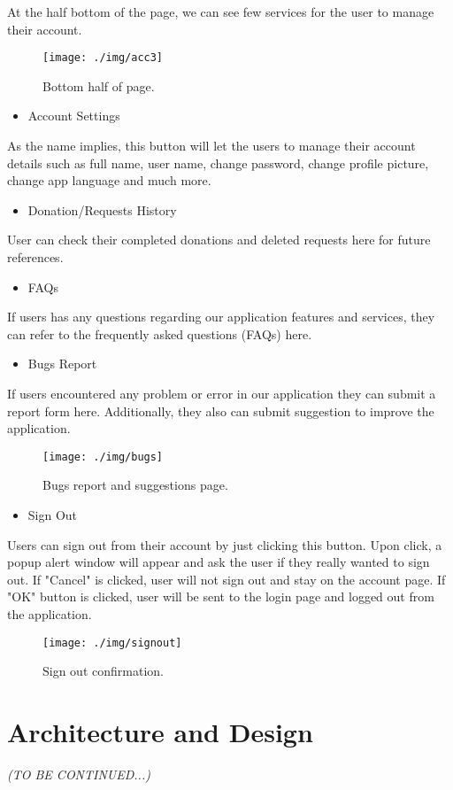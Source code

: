 \documentclass[conference]{IEEEtran}
\begin{document}
At the half bottom of the page, we can see few services for the user to manage their account. 
\begin{figure}[h!]
\texttt{[image: ./img/acc3]}
\centering
\caption{Bottom half of page.}
\end{figure}
\begin{itemize}
\item Account Settings
\end{itemize}
As the name implies, this button will let the users to manage their account details such as full name, user name, change password, change profile picture, change app language and much more.
\begin{itemize}
\item Donation/Requests History
\end{itemize}
User can check their completed donations and deleted requests here for future references.
\begin{itemize}
\item FAQs
\end{itemize}
If users has any questions regarding our application features and services, they can refer to the frequently asked questions (FAQs) here. 
\begin{itemize}
\item Bugs Report
\end{itemize}
If users encountered any problem or error in our application they can submit a report form here. Additionally, they also can submit suggestion to improve the application.

\begin{figure}[h!]
\texttt{[image: ./img/bugs]}
\centering
\caption{Bugs report and suggestions page.}
\end{figure}

\begin{itemize}
\item Sign Out
\end{itemize}
Users can sign out from their account by just clicking this button. Upon click, a popup alert window will appear and ask the user if they really wanted to sign out. If "Cancel" is clicked, user will not sign out and stay on the account page. If "OK" button is clicked, user will be sent to the login page and logged out from the application.

\begin{figure}[h!]
\texttt{[image: ./img/signout]}
\centering
\caption{Sign out confirmation.}
\end{figure}
\section{Architecture and Design}

\textit{(TO BE CONTINUED...)}
\end{document}
